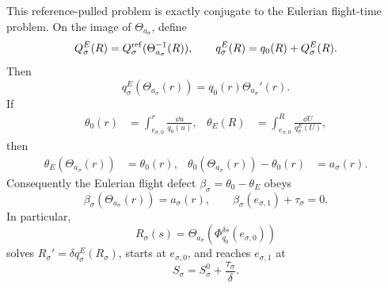 \begin{theorem}
This reference-pulled problem is exactly conjugate to the Eulerian
flight-time problem.  On the image of \(\Theta_{a_\sigma}\), define
\begin{equation}
 Q_\sigma^E(R)
 =Q_\sigma^{\rm ref}(\Theta_{a_\sigma}^{-1}(R)),
 \qquad q_\sigma^E(R)=q_0(R)+Q_\sigma^E(R).       \label{eq:reference-pulled-Eulerian-source}
\end{equation}
Then
\begin{equation}
 q_\sigma^E(\Theta_{a_\sigma}(r))
 =q_0(r)\Theta_{a_\sigma}'(r).                  \label{eq:reference-pulled-speed-conjugacy}
\end{equation}
If
\begin{align*}
 \theta_0(r)&=\int_{e_{\sigma,0}}^r\frac{\dd u}{q_0(u)},&
 \theta_E(R)&=\int_{e_{\sigma,0}}^R\frac{\dd U}{q_\sigma^E(U)},
\end{align*}
then
\begin{align}
 \theta_E(\Theta_{a_\sigma}(r))&=\theta_0(r),&
 \theta_0(\Theta_{a_\sigma}(r))-\theta_0(r)&=a_\sigma(r).
                                                        \label{eq:reference-pulled-flight-conjugacy}
\end{align}
Consequently the Eulerian flight defect
\(\beta_\sigma=\theta_0-\theta_E\) obeys
\begin{equation}
 \beta_\sigma(\Theta_{a_\sigma}(r))=a_\sigma(r),
 \qquad
 \beta_\sigma(e_{\sigma,1})+\tau_\sigma=0.      \label{eq:reference-pulled-beta-conjugacy}
\end{equation}
In particular,
\begin{equation}
 R_\sigma(s)=\Theta_{a_\sigma}
   (\Phi_{q_0}^{\delta s}(e_{\sigma,0}))         \label{eq:reference-pulled-physical-path}
\end{equation}
solves
\(R_\sigma'=\delta q_\sigma^E(R_\sigma)\), starts at
\(e_{\sigma,0}\), and reaches \(e_{\sigma,1}\) at
\begin{equation}
 S_\sigma=S_\sigma^0+\frac{\tau_\sigma}{\delta}.          \label{eq:reference-pulled-duration}
\end{equation}


\end{theorem}
